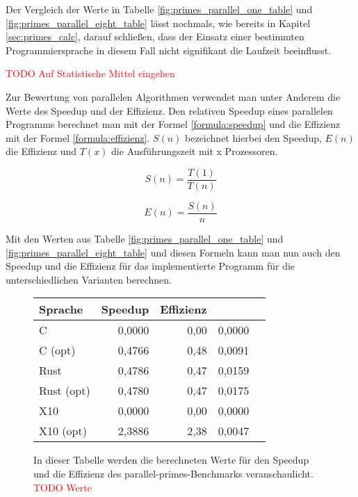 Der Vergleich der Werte in Tabelle \ref{fig:primes_parallel_one_table} und \ref{fig:primes_parallel_eight_table} lässt nochmals, wie bereits in Kapitel \ref{sec:primes_calc}, darauf schließen, dass der Einsatz einer bestimmten
Programmiersprache in diesem Fall nicht signifikant die Laufzeit beeinflusst.

\textcolor{red}{TODO Auf Statistische Mittel eingehen}

Zur Bewertung von parallelen Algorithmen verwendet man unter Anderem die Werte des Speedup und der Effizienz.
Den relativen Speedup eines parallelen Programms berechnet man mit der Formel \ref{formula:speedup} und die
Effizienz mit der Formel \ref{formula:effizienz}. $S(n)$ bezeichnet hierbei den Speedup, $E(n)$ die Effizienz
und $T(x)$ die Ausführungszeit mit x Prozessoren.

\begin{equation}
	\label{formula:speedup}
	S(n) = \frac{T(1)}{T(n)}
\end{equation}


\begin{equation}
	\label{formula:effizienz}
	E(n) = \frac{S(n)}{n}
\end{equation}

Mit den Werten aus Tabelle \ref{fig:primes_parallel_one_table} und \ref{fig:primes_parallel_eight_table} und diesen
Formeln kann man nun auch den Speedup und die Effizienz für das implementierte Programm für die unterschiedlichen
Varianten berechnen.

\begin{figure}[hb]
	\begin{center}
		\begin{tabular}{lrrrr}
			\toprule
			Sprache & Speedup & Effizienz \\
			\midrule
			C          & 0,0000 & 0,00 & 0,0000 \\
			C (opt)    & 0,4766 & 0,48 & 0,0091 \\
			Rust       & 0,4786 & 0,47 & 0,0159 \\
			Rust (opt) & 0,4780 & 0,47 & 0,0175 \\
			X10        & 0,0000 & 0,00 & 0,0000 \\
			X10 (opt)  & 2,3886 & 2,38 & 0,0047 \\
			\bottomrule
		\end{tabular}
	\end{center}
	\caption{
		In dieser Tabelle werden die berechneten Werte für den Speedup und die Effizienz des parallel-primes-Benchmarks
		veranschaulicht.
		\textcolor{red}{TODO Werte}
	}
	\label{fig:primes_parallel_speedup_efficiency_table}
\end{figure}


